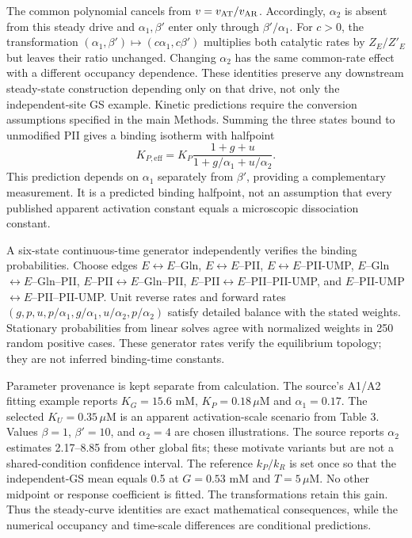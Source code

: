 \documentclass[11pt]{article}
\begin{document}
The common polynomial cancels from $v=v_{\rm AT}/v_{\rm AR}$. Accordingly, $\alpha_2$ is absent from this steady drive and $\alpha_1,\beta'$ enter only through $\beta'/\alpha_1$. For $c>0$, the transformation $(\alpha_1,\beta')\mapsto(c\alpha_1,c\beta')$ multiplies both catalytic rates by $Z_E/Z'_E$ but leaves their ratio unchanged. Changing $\alpha_2$ has the same common-rate effect with a different occupancy dependence. These identities preserve any downstream steady-state construction depending only on that drive, not only the independent-site GS example. Kinetic predictions require the conversion assumptions specified in the main Methods. Summing the three states bound to unmodified PII gives a binding isotherm with halfpoint
\[
K_{P,\mathrm{eff}}=K_P\frac{1+g+u}{1+g/\alpha_1+u/\alpha_2}.
\]
This prediction depends on $\alpha_1$ separately from $\beta'$, providing a complementary measurement. It is a predicted binding halfpoint, not an assumption that every published apparent activation constant equals a microscopic dissociation constant.

A six-state continuous-time generator independently verifies the binding probabilities. Choose edges $E\leftrightarrow E$--Gln, $E\leftrightarrow E$--PII, $E\leftrightarrow E$--PII-UMP, $E$--Gln$\leftrightarrow E$--Gln--PII, $E$--PII$\leftrightarrow E$--Gln--PII, $E$--PII$\leftrightarrow E$--PII--PII-UMP, and $E$--PII-UMP$\leftrightarrow E$--PII--PII-UMP. Unit reverse rates and forward rates $(g,p,u,p/\alpha_1,g/\alpha_1,u/\alpha_2,p/\alpha_2)$ satisfy detailed balance with the stated weights. Stationary probabilities from linear solves agree with normalized weights in 250 random positive cases. These generator rates verify the equilibrium topology; they are not inferred binding-time constants.

Parameter provenance is kept separate from calculation. The source's A1/A2 fitting example reports $K_G=15.6$ mM, $K_P=0.18\,\mu$M and $\alpha_1=0.17$. The selected $K_U=0.35\,\mu$M is an apparent activation-scale scenario from Table 3. Values $\beta=1$, $\beta'=10$, and $\alpha_2=4$ are chosen illustrations. The source reports $\alpha_2$ estimates 2.17--8.85 from other global fits; these motivate variants but are not a shared-condition confidence interval. The reference $k_P/k_R$ is set once so that the independent-GS mean equals 0.5 at $G=0.53$ mM and $T=5\,\mu$M. No other midpoint or response coefficient is fitted. The transformations retain this gain. Thus the steady-curve identities are exact mathematical consequences, while the numerical occupancy and time-scale differences are conditional predictions.
\end{document}
